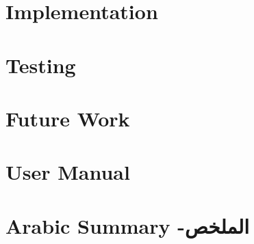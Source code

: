 \documentclass[12pt,twoside]{report}
\begin{document}
	\chapter{Implementation}
	
	
	\chapter{Testing}
	
	
	\chapter{Future Work}
	
	
	\renewcommand{\bibname}{References}
	\printbibliography
	
	\appendix
	\chapter{User Manual}
	
	
	\chapter{Arabic Summary -\textarabic[utf]{الملخص}}
	
\end{document}
